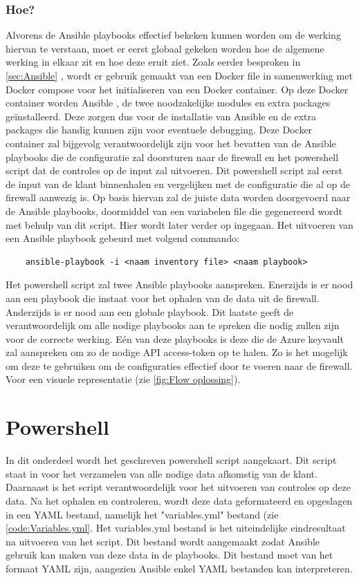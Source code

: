 \subsubsection{Hoe?}
\label{subsub:hoe}
Alvorens de Ansible playbooks effectief bekeken kunnen worden om de werking hiervan te verstaan, moet er eerst globaal gekeken worden hoe de algemene werking in elkaar zit en hoe deze eruit ziet. Zoals eerder besproken in \ref{sec:Ansible} , wordt er gebruik gemaakt van een Docker file in samenwerking met Docker compose voor het initialiseren van een Docker container. Op deze Docker container worden Ansible , de twee noodzakelijke modules en extra packages geïnstalleerd. Deze zorgen dus voor de installatie van Ansible en de extra packages die handig kunnen zijn voor eventuele debugging. Deze Docker container zal bijgevolg verantwoordelijk zijn voor het bevatten van de Ansible playbooks die de configuratie zal doorsturen naar de firewall en het powershell script dat de controles op de input zal uitvoeren. Dit powershell script zal eerst de input van de klant binnenhalen en vergelijken met de configuratie die al op de firewall aanwezig is. Op basis hiervan zal de juiste data worden doorgevoerd naar de Ansible playbooks, doormiddel van een variabelen file die gegenereerd wordt met behulp van dit script. Hier wordt later verder op ingegaan. \newline
Het uitvoeren van een Ansible playbook gebeurd met volgend commando: 

\begin{lstlisting}
    ansible-playbook -i <naam inventory file> <naam playbook> 
\end{lstlisting}
Het powershell script zal twee Ansible playbooks aanspreken. Enerzijds is er nood aan een playbook die instaat voor het ophalen van de data uit de firewall. Anderzijds is er nood aan een globale playbook. Dit laatste geeft de verantwoordelijk om alle nodige playbooks aan te spreken die nodig zullen zijn voor de correcte werking. Eén van deze playbooks is deze die de Azure keyvault zal aanspreken om zo de nodige API access-token op te halen. Zo is het mogelijk om deze te gebruiken om de configuraties effectief door te voeren naar de firewall. Voor een visuele representatie (zie \ref{fig:Flow oplossing}).

\section{Powershell}
\label{sec:powershell}
In dit onderdeel wordt het geschreven powershell script aangekaart. Dit script staat in voor het verzamelen van alle nodige data afkomstig van de klant. Daarnaast is het script verantwoordelijk voor het uitvoeren van controles op deze data. Na het ophalen en controleren, wordt deze data geformateerd en opgeslagen in een YAML bestand, namelijk het "variables.yml" bestand (zie \ref{code:Variables.yml}. Het variables.yml bestand is het uiteindelijke eindresultaat na uitvoeren van het script. Dit bestand wordt aangemaakt zodat Ansible gebruik kan maken van deze data in de playbooks. Dit bestand moet van het formaat YAML zijn, aangezien Ansible enkel YAML bestanden kan interpreteren. 

